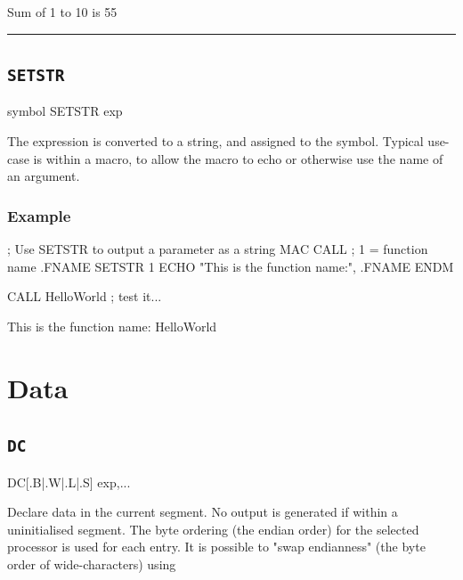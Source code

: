 \begin{outputx}
Sum of 1 to 10 is 55
\end{outputx}


\hrule
\subsection{\texttt{SETSTR}}
\label{pseudoop:setstr}

\begin{usage}
symbol SETSTR exp
\end{usage}

The expression is converted to a string, and assigned to the
symbol. Typical use-case is within a macro, to allow the
macro to echo or otherwise use the name of an argument.

\subsubsection{Example}

\begin{code}[caption=Use of SETSTR to Display Function Name]
; Use SETSTR to output a parameter as a string
    MAC CALL    ; {1} = function name
.FNAME  SETSTR {1}
        ECHO "This is the function name:", .FNAME
    ENDM
    
    CALL HelloWorld        ; test it...
\end{code}

\begin{outputx}
This is the function name: HelloWorld
\end{outputx}



\section{Data}
\subsection{\texttt{DC}}
\label{pseudoop:dc}

\begin{usage}
   DC[{.B|.W|.L|.S}] exp,...
\end{usage}
\label{changelog:20200915endian}
Declare data in the current segment.  No output is generated if within a uninitialised  segment. The byte ordering (the endian order) for the selected processor is used for each entry. It is possible to "swap endianness" (the byte order of wide-characters) using 

